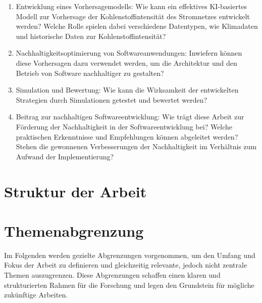 \begin{enumerate}
 \item Entwicklung eines Vorhersagemodells: Wie kann ein effektives \ac{KI}-basiertes Modell zur Vorhersage der Kohlenstoffintensität des Stromnetzes entwickelt werden? Welche Rolle spielen dabei verschiedene Datentypen, wie Klimadaten und historische Daten zur Kohlenstoffintensität?
 \item Nachhaltigkeitsoptimierung von Softwareanwendungen: Inwiefern können diese Vorhersagen dazu verwendet werden, um die Architektur und den Betrieb von Software nachhaltiger zu gestalten?
 \item Simulation und Bewertung: Wie kann die Wirksamkeit der entwickelten Strategien durch Simulationen getestet und bewertet werden?
 \item Beitrag zur nachhaltigen Softwareentwicklung: Wie trägt diese Arbeit zur Förderung der Nachhaltigkeit in der Softwareentwicklung bei? Welche praktischen Erkenntnisse und Empfehlungen können abgeleitet werden? Stehen die gewonnenen Verbesserungen der Nachhaltigkeit im Verhältnis zum Aufwand der Implementierung?
\end{enumerate}
%
\section{Struktur der Arbeit}
\section{Themenabgrenzung}
Im Folgenden werden gezielte Abgrenzungen vorgenommen, um den Umfang und Fokus der Arbeit zu definieren und gleichzeitig relevante, jedoch nicht zentrale Themen auszugrenzen.
Diese Abgrenzungen schaffen einen klaren und strukturierten Rahmen für die Forschung und legen den Grundstein für mögliche zukünftige Arbeiten.

